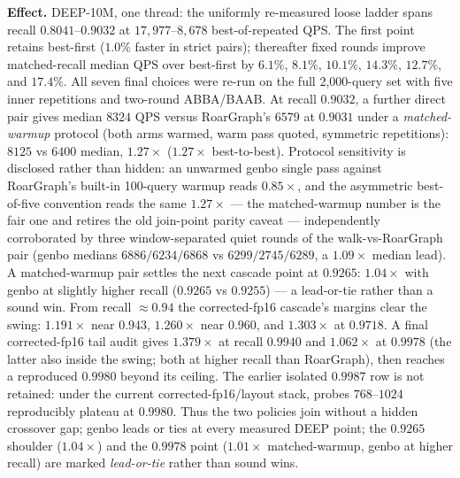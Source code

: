 \documentclass{article}
\newcommand{\effect}[1]{\par\smallskip\noindent\textbf{Effect.} #1}
\begin{document}
\effect{DEEP-10M, one thread: the uniformly re-measured loose ladder spans recall
$0.8041$--$0.9032$ at $17{,}977$--$8{,}678$ best-of-repeated QPS. The first point
retains best-first ($1.0\%$ faster in strict pairs); thereafter fixed rounds improve
matched-recall median QPS over best-first by $6.1\%$, $8.1\%$, $10.1\%$,
$14.3\%$, $12.7\%$, and $17.4\%$. All seven final choices were re-run on the full
2,000-query set with five inner repetitions and two-round ABBA/BAAB. At recall
$0.9032$, a further direct pair gives median $8324$ QPS versus RoarGraph's $6579$
at $0.9031$ under a \emph{matched-warmup} protocol (both arms warmed, warm pass quoted, symmetric repetitions): $8125$ vs $6400$ median, $1.27\times$ ($1.27\times$ best-to-best). Protocol sensitivity is disclosed rather than hidden: an unwarmed genbo single pass against RoarGraph's built-in 100-query warmup reads $0.85\times$, and the asymmetric best-of-five convention reads the same $1.27\times$ --- the matched-warmup number is the fair one and retires the old
join-point parity caveat --- independently corroborated by three window-separated
quiet rounds of the walk-vs-RoarGraph pair (genbo medians $6886/6234/6868$ vs
$6299/2745/6289$, a $1.09\times$ median lead). A matched-warmup pair settles the next cascade point at $0.9265$:
$1.04\times$ with genbo at slightly higher recall ($0.9265$ vs $0.9255$) --- a
lead-or-tie rather than a sound win. From recall ${\approx}0.94$ the corrected-fp16 cascade's margins clear
the swing: $1.191\times$ near $0.943$, $1.260\times$ near $0.960$, and
$1.303\times$ at $0.9718$. A final corrected-fp16 tail audit gives
$1.379\times$ at recall $0.9940$ and $1.062\times$ at $0.9978$ (the latter also
inside the swing; both at
higher recall than RoarGraph), then reaches a reproduced $0.9980$ beyond its
ceiling. The earlier isolated $0.9987$ row is not retained: under the current
corrected-fp16/layout stack, probes $768$--$1024$ reproducibly plateau at
$0.9980$. Thus
the two policies join without a hidden crossover gap; genbo leads or ties at every
measured DEEP point; the $0.9265$ shoulder ($1.04\times$) and the $0.9978$ point
($1.01\times$ matched-warmup, genbo at higher recall) are marked
\emph{lead-or-tie} rather than sound wins.}

\FloatBarrier
\end{document}
